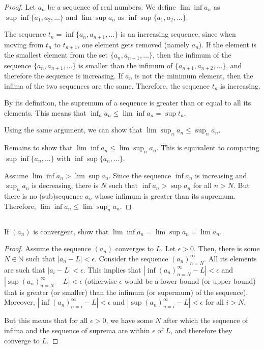 \begin{proof}

Let $a_n$ be a sequence of real numbers. We define $\lim \inf a_n$ as $\sup \inf\{a_1, a_2, \dots\}$ and $\lim \sup a_n$ as $\inf \sup\{a_1, a_2, \dots\}$.

The sequence $t_n = \inf\{a_n, a_{n+1}, \dots\}$ is an increasing sequence, since when moving from $t_n$ to $t_{n+1}$, one element gets removed (namely $a_n$). If the element is the smallest element from the set $\{a_n, a_{n+1}, \dots\}$, then the infimum of the sequence $\{a_n, a_{n+1}, \dots\}$ is smaller than the infimum of $\{a_{n+1}, a_{n+2}, \dots\}$, and therefore the sequence is increasing. If $a_n$ is not the minimum element, then the infima of the two sequences are the same. Therefore, the sequence $t_n$ is increasing.

By its definition, the supremum of a sequence is greater than or equal to all its elements. This means that $\inf_n a_n \leq \lim \inf a_n = \sup t_n$. 

Using the same argument, we can show that $\lim \sup_n a_n \leq \sup_n a_n$.

Remains to show that $\lim \inf a_n \leq \lim \sup_n a_n$. This is equivalent to comparing $\sup \inf\{a_n, \dots\}$ with $\inf \sup\{a_n, \dots\}$.

Assume $\lim \inf a_n > \lim \sup a_n$. Since the sequence $\inf a_n$ is increasing and $\sup_n a_n$ is decreasing, there is $N$ such that $\inf a_n > \sup a_n$ for all $n > N$. But there is no (sub)sequence $a_n$ whose infimum is greater than its supremum. Therefore, $\lim \inf a_n \leq \lim \sup_n a_n$.

\end{proof}

\subsection{} If $(a_n)$ is convergent, show that $\lim \inf a_n = \lim \sup a_n = \lim a_n$.

\begin{proof}
Assume the sequence $(a_n)$ converges to $L$. Let $\epsilon>0$. Then, there is some $N \in \mathbb{N}$ such that $|a_n - L| < \epsilon$. Consider the sequence $(a_n)_{n=N}^{\infty}$. All its elements are such that $|a_i - L| < \epsilon$. This implies that $|\inf (a_n)_{n=N}^{\infty} - L| < \epsilon$ and $|\sup (a_n)_{n=N}^{\infty} - L| < \epsilon$ (otherwise $\epsilon$ would be a lower bound (or upper bound) that is greater (or smaller) than the infimum (or supermum) of the sequence). Moreover, $|\inf (a_n)_{n=i}^{\infty} - L| < \epsilon$ and $|\sup (a_n)_{n=i}^{\infty} - L| < \epsilon$ for all $i > N$. 

But this means that for all $\epsilon > 0$, we have some $N$ after which the sequence of infima and the sequence of suprema are within $\epsilon$ of $L$, and therefore they converge to $L$.

\end{proof}


